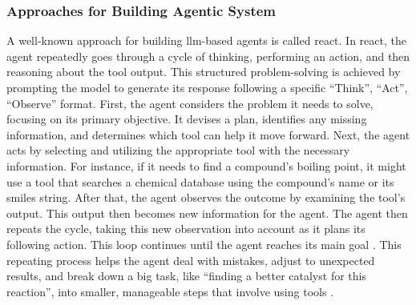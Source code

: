 \documentclass[11pt, oneside]{article}
\providecommand{\DIFaddtex}[1]{{\protect\color{blue}\uwave{#1}}} %
\providecommand{\DIFaddbegin}{} %
\providecommand{\DIFaddend}{} %
\providecommand{\DIFadd}[1]{\texorpdfstring{\DIFaddtex{#1}}{#1}} %
\newcommand{\DIFaddincludegraphics}[2][]{{\color{blue}\fbox{\DIFOincludegraphics[#1]{#2}}}} %
\DeclareRobustCommand{\DIFaddbegin}{\DIFOaddbegin \let\includegraphics\DIFaddincludegraphics} %
\DeclareRobustCommand{\DIFaddend}{\DIFOaddend \let\includegraphics\DIFOincludegraphics} %
\begin{document}
\subsubsection{Approaches for Building Agentic System}

A well-known approach for building \gls{llm}-based agents is called \gls{react}\autocite{yao2023react}. In \gls{react}, the agent repeatedly goes through a cycle of thinking, performing an action, and then reasoning about the tool output. 
This structured problem-solving is achieved by prompting the model to generate its response following a specific \enquote{Think}, \enquote{Act}, \enquote{Observe} format.
First, the agent considers the problem it needs to solve, focusing on its primary objective. It devises a plan, identifies any missing information, and determines which tool can help it move forward. Next, the agent acts by selecting and utilizing the appropriate tool with the necessary information. For instance, if it needs to find a compound's boiling point, it might use a tool that searches a chemical database using the compound's name or its \gls{smiles} string. After that, the agent observes the outcome by examining the tool's output. This output then becomes new information for the agent. The agent then repeats the cycle, taking this new observation into account as it plans its following action. This loop continues until the agent reaches its main goal \DIFaddbegin \DIFadd{(see example~\ref{example:structure_eluc})}\DIFaddend . This repeating process helps the agent deal with mistakes, adjust to unexpected results, and break down a big task, like \enquote{finding a better catalyst for this reaction}, into smaller, manageable steps that involve using tools \DIFaddbegin \DIFadd{(see example below)}\DIFaddend .
\end{document}
